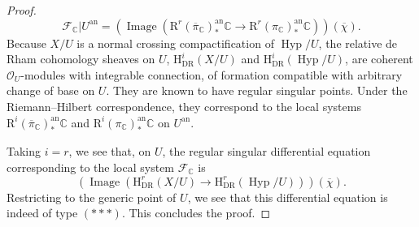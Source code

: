 \begin{proof}
\[
\mathcal{F}_{\mathbb{C}}|U^{\mathrm{an}}=(\operatorname{Image}(\mathrm{R}^r(\overline{\pi}_{\mathbb{C}})^{\mathrm{an}}_*\mathbb{C}\to\mathrm{R}^r(\pi_{\mathbb{C}})^{\mathrm{an}}_*\mathbb{C}))(\overline{\chi}).
\]
Because \(X/U\) is a normal crossing compactification of \(\operatorname{Hyp}/U\), the relative de Rham cohomology sheaves on \(U\), \(\mathrm{H}^i_{\mathrm{DR}}(X/U)\) and \(\mathrm{H}^i_{\mathrm{DR}}(\operatorname{Hyp}/U)\), are coherent \(\mathcal{O}_U\)-modules with integrable connection, of formation compatible with arbitrary change of base on \(U\). They are known \cite{Ka-NCMT} to have regular singular points. Under the Riemann--Hilbert correspondence, they correspond to the local systems \(\mathrm{R}^i(\overline{\pi}_{\mathbb{C}})^{\mathrm{an}}_*\mathbb{C}\) and \(\mathrm{R}^i(\pi_{\mathbb{C}})^{\mathrm{an}}_*\mathbb{C}\) on \(U^{\mathrm{an}}\).

Taking \(i=r\), we see that, on \(U\), the regular singular differential equation corresponding to the local system \(\mathcal{F}_{\mathbb{C}}\) is
\[
(\operatorname{Image}(\mathrm{H}^r_{\mathrm{DR}}(X/U)\to\mathrm{H}^r_{\mathrm{DR}}(\operatorname{Hyp}/U)))(\overline{\chi}).
\]
Restricting to the generic point of \(U\), we see that this differential equation is indeed of type \((***)\). This concludes the proof.
\end{proof}

